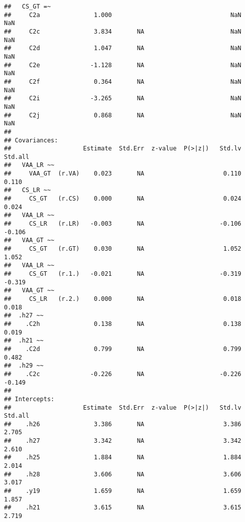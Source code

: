 \documentclass[
]{article}
\begin{document}
\begin{verbatim}
##   CS_GT =~                                                              
##     C2a               1.000                                 NaN      NaN
##     C2c               3.834       NA                        NaN      NaN
##     C2d               1.047       NA                        NaN      NaN
##     C2e              -1.128       NA                        NaN      NaN
##     C2f               0.364       NA                        NaN      NaN
##     C2i              -3.265       NA                        NaN      NaN
##     C2j               0.868       NA                        NaN      NaN
## 
## Covariances:
##                    Estimate  Std.Err  z-value  P(>|z|)   Std.lv  Std.all
##   VAA_LR ~~                                                             
##     VAA_GT  (r.VA)    0.023       NA                      0.110    0.110
##   CS_LR ~~                                                              
##     CS_GT   (r.CS)    0.000       NA                      0.024    0.024
##   VAA_LR ~~                                                             
##     CS_LR   (r.LR)   -0.003       NA                     -0.106   -0.106
##   VAA_GT ~~                                                             
##     CS_GT   (r.GT)    0.030       NA                      1.052    1.052
##   VAA_LR ~~                                                             
##     CS_GT   (r.1.)   -0.021       NA                     -0.319   -0.319
##   VAA_GT ~~                                                             
##     CS_LR   (r.2.)    0.000       NA                      0.018    0.018
##  .h27 ~~                                                                
##    .C2h               0.138       NA                      0.138    0.019
##  .h21 ~~                                                                
##    .C2d               0.799       NA                      0.799    0.482
##  .h29 ~~                                                                
##    .C2c              -0.226       NA                     -0.226   -0.149
## 
## Intercepts:
##                    Estimate  Std.Err  z-value  P(>|z|)   Std.lv  Std.all
##    .h26               3.386       NA                      3.386    2.705
##    .h27               3.342       NA                      3.342    2.610
##    .h25               1.884       NA                      1.884    2.014
##    .h28               3.606       NA                      3.606    3.017
##    .y19               1.659       NA                      1.659    1.857
##    .h21               3.615       NA                      3.615    2.719

\end{verbatim}
\end{document}
